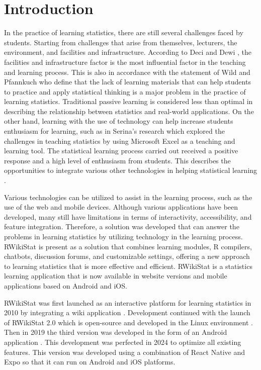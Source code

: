 \documentclass[conference,a4paper]{IEEEtran}
\begin{document}
\section{Introduction}
\label{sect:introduction}

In the practice of learning statistics, there are still several challenges faced by students. Starting from challenges that arise from themselves, lecturers, the environment, and facilities and infrastructure. According to Deci and Dewi \cite{b1}, the facilities and infrastructure factor is the most influential factor in the teaching and learning process. This is also in accordance with the statement of Wild and Pfannkuch \cite{b2} who define that the lack of learning materials that can help students to practice and apply statistical thinking is a major problem in the practice of learning statistics. Traditional passive learning is considered less than optimal in describing the relationship between statistics and real-world applications. On the other hand, learning with the use of technology can help increase students enthusiasm for learning, such as in Serina's research which explored the challenges in teaching statistics by using Microsoft Excel as a teaching and learning tool. The statistical learning process carried out received a positive response and a high level of enthusiasm from students. This describes the opportunities to integrate various other technologies in helping statistical learning \cite{b3}.

Various technologies can be utilized to assist in the learning process, such as the use of the web and mobile devices. Although various applications have been developed, many still have limitations in terms of interactivity, accessibility, and feature integration. Therefore, a solution was developed that can answer the problems in learning statistics by utilizing technology in the learning process. RWikiStat is present as a solution that combines learning modules, R compilers, chatbots, discussion forums, and customizable settings, offering a new approach to learning statistics that is more effective and efficient. RWikiStat is a statistics learning application that is now available in website versions and mobile applications based on Android and iOS.

RWikiStat was first launched as an interactive platform for learning statistics in 2010 by integrating a wiki application \cite{b4}. Development continued with the launch of RWikiStat 2.0 which is open-source and developed in the Linux environment \cite{b5}. Then in 2019 the third version was developed in the form of an Android application \cite{b6}. This development was perfected in 2024 to optimize all existing features. This version was developed using a combination of React Native and Expo so that it can run on Android and iOS platforms.
\end{document}
